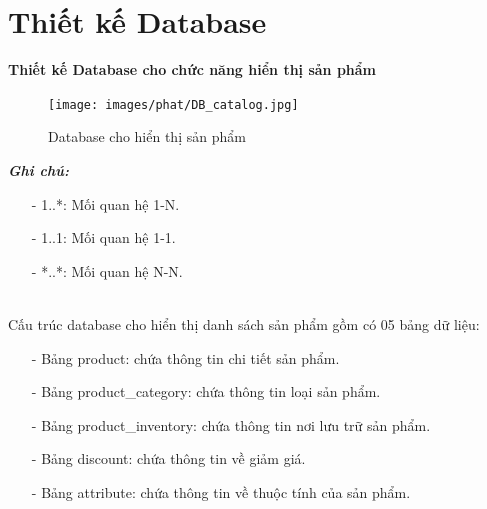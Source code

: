 \section{Thiết kế Database}
\textbf{Thiết kế Database cho chức năng hiển thị sản phẩm}
 \begin{figure}[H]
    \begin{center}
    \texttt{[image: images/phat/DB\_catalog.jpg]}
    \vspace*{7mm}
    \caption{Database cho hiển thị sản phẩm}
    \end{center}
    \label{}
\end{figure}
\textbf{\textit{Ghi chú:}}
\begin{itemize}
    \item [-] 1..*: Mối quan hệ 1-N.
    \item [-] 1..1: Mối quan hệ 1-1.
    \item [-] *..*: Mối quan hệ N-N.
\end{itemize}
\\[0.5cm]
\noindent Cấu trúc database cho hiển thị danh sách sản phẩm gồm có 05 bảng dữ liệu:
\begin{itemize}
    \item [-] Bảng product: chứa thông tin chi tiết sản phẩm.
    \item [-] Bảng product\_category: chứa thông tin loại sản phẩm.
    \item [-] Bảng product\_inventory: chứa thông tin nơi lưu trữ sản phẩm.
    \item [-] Bảng discount: chứa thông tin về giảm giá.
    \item [-] Bảng attribute: chứa thông tin về thuộc tính của sản phẩm.
\end{itemize}
